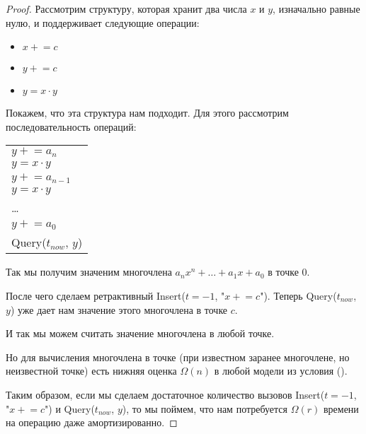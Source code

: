 \begin{proof}

Рассмотрим структуру, которая хранит два числа $x$ и $y$, изначально равные нулю, и поддерживает следующие операции:

\newcommand{\pluseq}{\mathrel{+}=}

\begin{itemize}

\item $x \pluseq c$
\item $y \pluseq c$
\item $y = x \cdot y$

\end{itemize}

Покажем, что эта структура нам подходит.
Для этого рассмотрим последовательность операций:

\begin{tabular}{ l }

$y \pluseq a_n$\\
$y = x \cdot y$\\
$y \pluseq a_{n - 1}$\\
$y = x \cdot y$\\
\dots\\
$y \pluseq a_0$\\
Query($t_{now}$, $y$)

\end{tabular}

\vspace{10pt}
Так мы получим значеним многочлена $a_n x^n + \dots + a_1 x + a_0$ в точке 0.

После чего сделаем ретрактивный Insert($t = -1$, "$x \pluseq c$").
Теперь Query($t_{now}$, $y$) уже дает нам значение этого многочлена в точке $c$.

И так мы можем считать значение многочлена в любой точке.

Но для вычисления многочлена в точке (при известном заранее многочлене, но неизвестной точке) есть нижняя оценка $\Omega(n)$ в любой модели из условия (\cite{frandsen2001lower}).

Таким образом, если мы сделаем достаточное количество вызовов Insert($t = -1$, "$x \pluseq c$") и Query($t_{now}$, $y$), то мы поймем, что нам потребуется $\Omega(r)$ времени на операцию даже амортизированно.
\end{proof}

